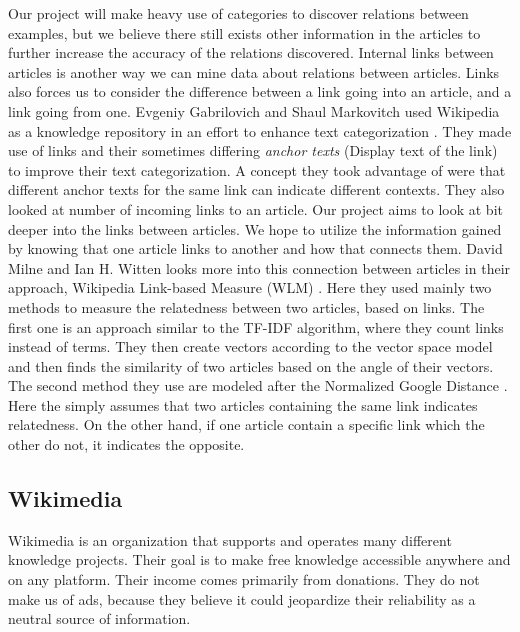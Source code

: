 Our project will make heavy use of categories to discover relations between examples, but we believe there still exists other information in the articles to further increase the accuracy of the relations discovered. Internal links between articles is another way we can mine data about relations between articles. Links also forces us to consider the difference between a link going into an article, and a link going from one. Evgeniy Gabrilovich and Shaul Markovitch used Wikipedia as a knowledge repository in an effort to enhance text categorization  \cite{text-cat}. They made use of links and their sometimes differing \textit{anchor texts} (Display text of the link) to improve their text categorization. A concept they took advantage of were that different anchor texts for the same link can indicate different contexts.  They also looked at number of incoming links to an article. Our project aims to look at bit deeper into the links between articles. We hope to utilize the information gained by knowing that one article links to another and how that connects them. David Milne and Ian H. Witten looks more into this connection between articles in their approach,  Wikipedia Link-based Measure (WLM) \cite{wlm}. Here they used mainly two methods to measure the relatedness between two articles, based on links. The first one is an approach similar to the TF-IDF algorithm, where they count links instead of terms. They then create vectors according to the vector space model and then finds the similarity of two articles based on the angle of their vectors. The second method they use are modeled after the Normalized Google Distance  \cite{gsd}. Here the simply assumes that two articles containing the same link indicates relatedness. On the other hand, if one article contain a specific link which the other do not, it indicates the opposite.



\subsection{Wikimedia} \label{wikimedia}
Wikimedia \cite{wikimedia} is an organization that supports and operates many different knowledge projects. Their goal is to make free knowledge accessible anywhere and on any platform. Their income comes primarily from donations. They do not make us of ads, because they believe it could jeopardize their reliability as a neutral source of information.

